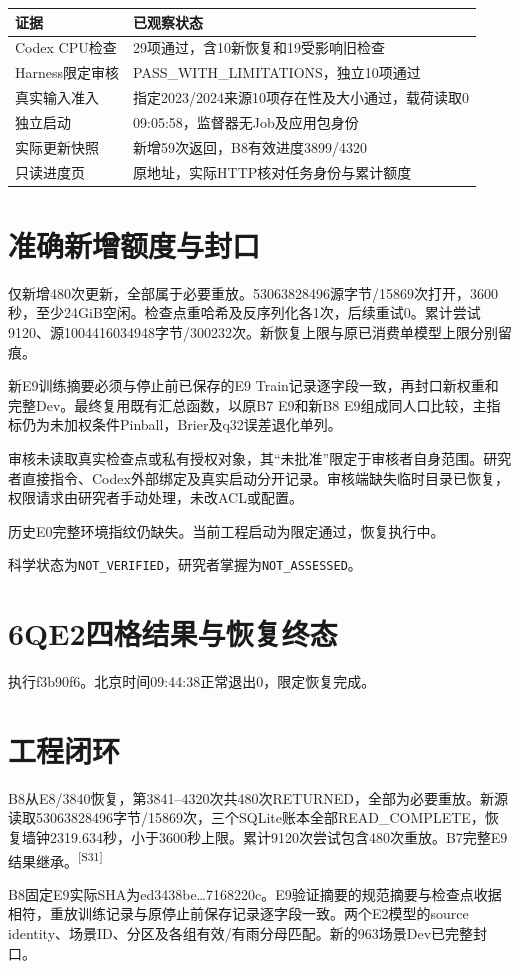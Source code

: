 \documentclass[UTF8,10.5pt,a4paper,fontset=none]{ctexart}
\newcommand{\evi}[1]{\textsuperscript{\color{muted}[#1]}}
\newcommand{\pageheading}[2]{\clearpage\section*{#1}\textcolor{muted}{#2}\par\vspace{3pt}}
\begin{document}
\begin{tabularx}{\textwidth}{@{}p{4.3cm}X@{}}
\toprule 证据 & 已观察状态\\\midrule
Codex CPU检查 & 29项通过，含10新恢复和19受影响旧检查\\
Harness限定审核 & PASS\_WITH\_LIMITATIONS，独立10项通过\\
真实输入准入 & 指定2023/2024来源10项存在性及大小通过，载荷读取0\\
独立启动 & 09:05:58，监督器无Job及应用包身份\\
实际更新快照 & 新增59次返回，B8有效进度3899/4320\\
只读进度页 & 原地址，实际HTTP核对任务身份与累计额度\\
\bottomrule
\end{tabularx}

\section*{准确新增额度与封口}
仅新增480次更新，全部属于必要重放。53063828496源字节/15869次打开，3600秒，至少24GiB空闲。检查点重哈希及反序列化各1次，后续重试0。累计尝试9120、源1004416034948字节/300232次。新恢复上限与原已消费单模型上限分别留痕。

新E9训练摘要必须与停止前已保存的E9 Train记录逐字段一致，再封口新权重和完整Dev。最终复用既有汇总函数，以原B7 E9和新B8 E9组成同人口比较，主指标仍为未加权条件Pinball，Brier及q32误差退化单列。

审核未读取真实检查点或私有授权对象，其“未批准”限定于审核者自身范围。研究者直接指令、Codex外部绑定及真实启动分开记录。审核端缺失临时目录已恢复，权限请求由研究者手动处理，未改ACL或配置。

历史E0完整环境指纹仍缺失。当前工程启动为限定通过，恢复执行中。\par 科学状态为\texttt{NOT\_VERIFIED}，研究者掌握为\texttt{NOT\_ASSESSED}。

\pageheading{6Q\quad E2四格结果与恢复终态}{执行f3b90f6。北京时间09:44:38正常退出0，限定恢复完成。}
\section*{工程闭环}
B8从E8/3840恢复，第3841--4320次共480次RETURNED，全部为必要重放。新源读取53063828496字节/15869次，三个SQLite账本全部READ\_COMPLETE，恢复墙钟2319.634秒，小于3600秒上限。累计9120次尝试包含480次重放。B7完整E9结果继承。\evi{S31}

B8固定E9实际SHA为ed3438be\ldots7168220c。E9验证摘要的规范摘要与检查点收据相符，重放训练记录与原停止前保存记录逐字段一致。两个E2模型的source identity、场景ID、分区及各组有效/有雨分母匹配。新的963场景Dev已完整封口。
\end{document}
